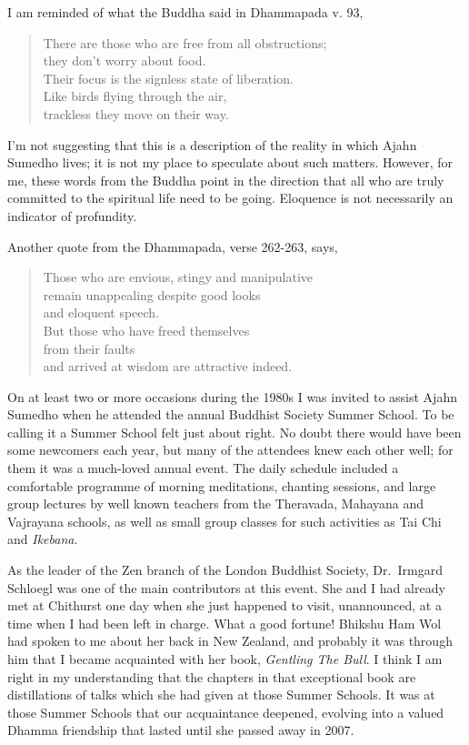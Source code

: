 I am reminded of what the Buddha said in Dhammapada v. 93,

\clearpage

\begin{quote}
  There are those who are free from all obstructions;\\
  they don't worry about food.\\
  Their focus is the signless state of liberation.\\
  Like birds flying through the air,\\
  trackless they move on their way.
\end{quote}

I'm not suggesting that this is a description of the reality in which
Ajahn Sumedho lives; it is not my place to speculate about such matters.
However, for me, these words from the Buddha point in the direction that
all who are truly committed to the spiritual life need to be going.
Eloquence is not necessarily an indicator of profundity.

Another quote from the Dhammapada, verse 262-263, says,

\begin{quote}
  Those who are envious, stingy and manipulative\\
  remain unappealing despite good looks\\
  and eloquent speech.\\
  But those who have freed themselves\\
  from their faults\\
  and arrived at wisdom are attractive indeed.
\end{quote}

On at least two or more occasions during the 1980s I was invited to
assist Ajahn Sumedho when he attended the annual Buddhist Society Summer
School\cite{summer}.
To be calling it a Summer School felt just about right.
No doubt there would have been some newcomers each year, but many of the
attendees knew each other well; for them it was a much-loved annual
event. The daily schedule included a comfortable programme of morning
meditations, chanting sessions, and large group lectures by well known
teachers from the Theravada, Mahayana and Vajrayana schools, as well as
small group classes for such activities as Tai Chi and \emph{Ikebana}\cite{ikebana}.

As the leader of the Zen branch of the London Buddhist Society, Dr.~Irmgard Schloegl\cite{irmgard}
was one of the main contributors at this event. She
and I had already met at Chithurst one day when she just happened to
visit, unannounced, at a time when I had been left in charge. What a
good fortune! Bhikshu Ham Wol had spoken to me about her back in New
Zealand, and probably it was through him that I became acquainted with
her book, \emph{Gentling The Bull}\cite{bull}.
I think I am right in my understanding that the
chapters in that exceptional book are distillations of talks which she
had given at those Summer Schools. It was at those Summer Schools that
our acquaintance deepened, evolving into a valued Dhamma friendship that
lasted until she passed away in 2007.

